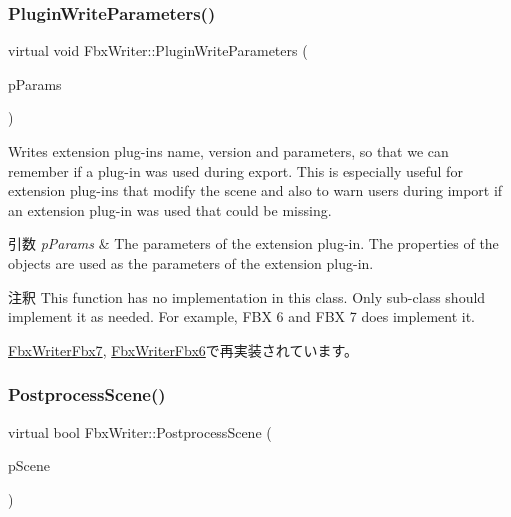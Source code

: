 \mbox{\label{class_fbx_writer_a851219ad904ebdce34acd3b8699cb0c8}} 
\subsubsection{\texorpdfstring{Plugin\+Write\+Parameters()}{PluginWriteParameters()}}
{\footnotesize\ttfamily virtual void Fbx\+Writer\+::\+Plugin\+Write\+Parameters (\begin{DoxyParamCaption}\item[{\hyperlink{class_fbx_object}{Fbx\+Object} \&}]{p\+Params }\end{DoxyParamCaption})\hspace{0.3cm}{\ttfamily [virtual]}}

Writes extension plug-\/ins name, version and parameters, so that we can remember if a plug-\/in was used during export. This is especially useful for extension plug-\/ins that modify the scene and also to warn users during import if an extension plug-\/in was used that could be missing. 
\begin{DoxyParams}{引数}
{\em p\+Params} & The parameters of the extension plug-\/in. The properties of the objects are used as the parameters of the extension plug-\/in. \\
\hline
\end{DoxyParams}
\begin{DoxyRemark}{注釈}
This function has no implementation in this class. Only sub-\/class should implement it as needed. For example, F\+BX 6 and F\+BX 7 does implement it. 
\end{DoxyRemark}


\hyperlink{class_fbx_writer_fbx7_a36f757ea224bdb66cf732cb9a5a534f2}{Fbx\+Writer\+Fbx7}, \hyperlink{class_fbx_writer_fbx6_a2dd451ffa9e15aca1f5130c7334163a4}{Fbx\+Writer\+Fbx6}で再実装されています。

\mbox{\label{class_fbx_writer_a1cfdf59f72ebe777484862e4b64b5d65}} 
\subsubsection{\texorpdfstring{Postprocess\+Scene()}{PostprocessScene()}}
{\footnotesize\ttfamily virtual bool Fbx\+Writer\+::\+Postprocess\+Scene (\begin{DoxyParamCaption}\item[{\hyperlink{class_fbx_scene}{Fbx\+Scene} \&}]{p\+Scene }\end{DoxyParamCaption})\hspace{0.3cm}{\ttfamily [pure virtual]}}

